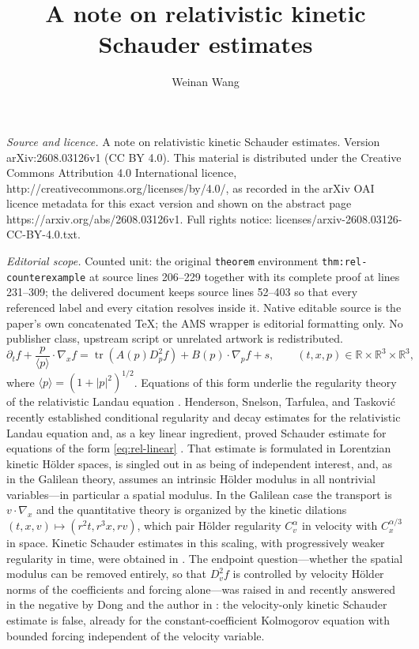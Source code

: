 \documentclass[10pt,a4paper]{amsart}
\numberwithin{equation}{section}
\DeclareMathOperator{\tr}{tr}
\newcommand{\R}{\mathbb R}
\newcommand{\la}[1]{\langle #1\rangle}
\begin{document}
\title[A note on relativistic kinetic Schauder estimates]{A note on relativistic kinetic Schauder estimates}
\author{Weinan Wang}
\date{}
\maketitle
\noindent\emph{Source and licence.} A note on relativistic kinetic Schauder estimates. Version arXiv:2608.03126v1 (CC BY 4.0). This material is distributed under the Creative Commons Attribution 4.0 International licence, http://creativecommons.org/licenses/by/4.0/, as recorded in the arXiv OAI licence metadata for this exact version and shown on the abstract page https://arxiv.org/abs/2608.03126v1. Full rights notice: licenses/arxiv-2608.03126-CC-BY-4.0.txt.\par\smallskip
\noindent\textit{Editorial scope.} Counted unit: the original \texttt{theorem} environment \texttt{thm:rel-counterexample} at source lines 206--229 together with its complete proof at lines 231--309; the delivered document keeps source lines 52--403 so that every referenced label and every citation resolves inside it. Native editable source is the paper's own concatenated TeX; the AMS wrapper is editorial formatting only. No publisher class, upstream script or unrelated artwork is redistributed.
\begin{equation}\label{eq:rel-linear}
   \partial_t f+\frac{p}{\la p}\cdot\nabla_x f
   =\tr\!\left(A(p)D_p^2f\right)+B(p)\cdot\nabla_pf+s,
   \qquad (t,x,p)\in\R\times\R^3\times\R^3,
\end{equation}
where $\la p=(1+|p|^2)^{1/2}$.  Equations of this form underlie the regularity theory of the relativistic Landau equation \cite{SG04,ST19}.  Henderson, Snelson, Tarfulea, and Taskovi\'c \cite{HSTT} recently established conditional regularity and decay estimates for the relativistic Landau equation and, as a key linear ingredient, proved  Schauder estimate for equations of the form \eqref{eq:rel-linear} \cite[Theorem~6.5]{HSTT}.  That estimate is formulated in Lorentzian kinetic H\"older spaces, is singled out in \cite{HSTT} as being of independent interest, and, as in the Galilean theory, assumes an intrinsic H\"older modulus in all nontrivial variables---in particular a spatial modulus. In the Galilean case the transport is $v\cdot\nabla_x$ and the quantitative theory is organized by the kinetic dilations $(t,x,v)\mapsto(r^2t,r^3x,rv)$, which pair H\"older regularity $C_v^\alpha$ in velocity with $C_x^{\alpha/3}$ in space.  Kinetic Schauder estimates in this scaling, with progressively weaker regularity in time, were obtained in \cite{IM21,HW24,BB24,LPP23,DY25}.  The endpoint question---whether the spatial modulus can be removed entirely, so that $D_v^2f$ is controlled by velocity H\"older norms of the coefficients and forcing alone---was raised in \cite[Conjecture~1.3]{HW24} and recently answered in the negative by Dong and the author in \cite{DW26}: the velocity-only kinetic Schauder estimate is false, already for the constant-coefficient Kolmogorov equation with bounded forcing independent of the velocity variable.
\end{document}
